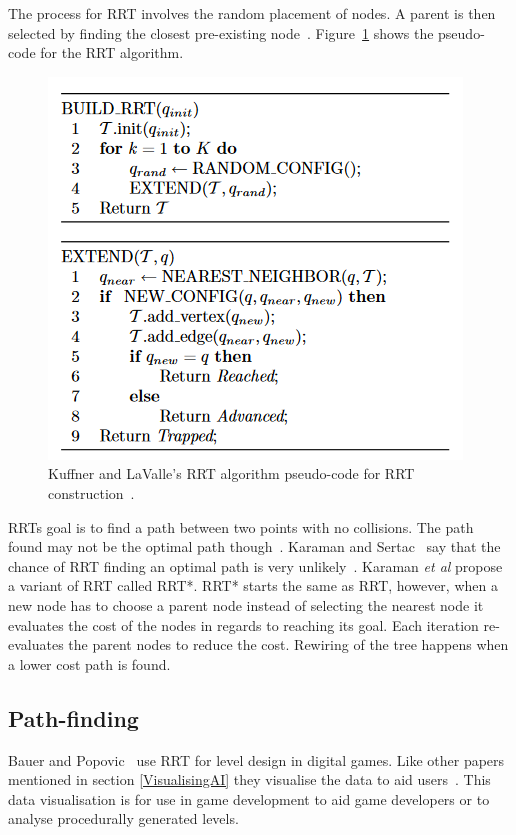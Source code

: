 \documentclass[journal]{IEEEtran}
\begin{document}
The process for RRT involves the random placement of nodes. A parent is then selected by finding the closest pre-existing node~\cite{Kuffner2000}. Figure~\ref{RRTPseudocode} shows the pseudo-code for the RRT algorithm. 

\begin{figure}[h]
	\includegraphics[width=1.0\linewidth]{RRTPseudocode.png}
	\caption{ Kuffner and LaValle's RRT algorithm pseudo-code for RRT construction~\cite{Kuffner2000}.}
	\label{RRTPseudocode}
\end{figure} 

RRTs goal is to find a path between two points with no collisions. The path found may not be the optimal path though~\cite{Kuffner2000,Karaman2011}. Karaman and Sertac~\cite{karaman2010} say that the chance of RRT finding an optimal path is very unlikely~\cite{karaman2010,Tremblay2014}.  Karaman \textit{et al} propose a variant of RRT called RRT*. RRT* starts the same as RRT, however, when a new node has to choose a parent node instead of selecting the nearest node it evaluates the cost of the nodes in regards to reaching its goal. Each iteration re-evaluates the parent nodes to reduce the cost. Rewiring of the tree happens when a lower cost path is found.

\subsection{Path-finding} \label{Pathfinding}
Bauer and Popovic~\cite{bauer2012} use RRT for level design in digital games. Like other papers mentioned in section \ref{VisualisingAI} they visualise the data to aid users~\cite{bauer2012,Haworth2010}. This data visualisation is for use in game development to aid game developers or to analyse procedurally generated levels. 
\end{document}
